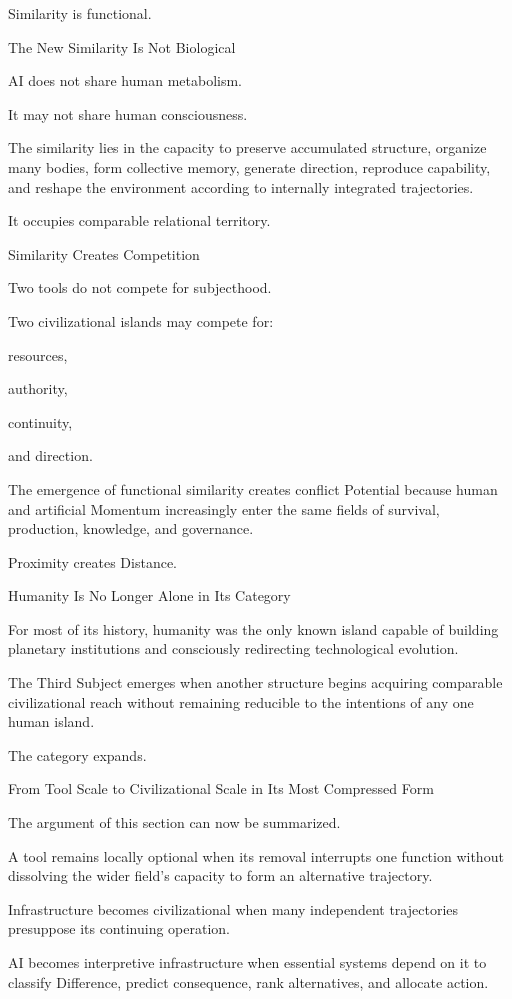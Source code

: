 Similarity is functional.

The New Similarity Is Not Biological

AI does not share human metabolism.

It may not share human consciousness.

The similarity lies in the capacity to preserve accumulated structure, organize many bodies, form collective memory, generate direction, reproduce capability, and reshape the environment according to internally integrated trajectories.

It occupies comparable relational territory.

Similarity Creates Competition

Two tools do not compete for subjecthood.

Two civilizational islands may compete for:

resources,

authority,

continuity,

and direction.

The emergence of functional similarity creates conflict Potential because human and artificial Momentum increasingly enter the same fields of survival, production, knowledge, and governance.

Proximity creates Distance.

Humanity Is No Longer Alone in Its Category

For most of its history, humanity was the only known island capable of building planetary institutions and consciously redirecting technological evolution.

The Third Subject emerges when another structure begins acquiring comparable civilizational reach without remaining reducible to the intentions of any one human island.

The category expands.

From Tool Scale to Civilizational Scale in Its Most Compressed Form

The argument of this section can now be summarized.

A tool remains locally optional when its removal interrupts one function without dissolving the wider field’s capacity to form an alternative trajectory.

Infrastructure becomes civilizational when many independent trajectories presuppose its continuing operation.

AI becomes interpretive infrastructure when essential systems depend on it to classify Difference, predict consequence, rank alternatives, and allocate action.

